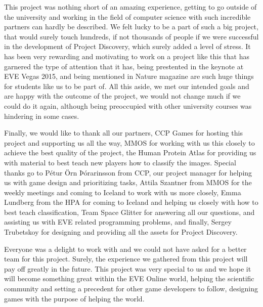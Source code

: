 This project was nothing short of an amazing experience, getting to go outside of the university and working in the field of computer science with such incredible partners can hardly be described. We felt lucky to be a part of such a big project, that would surely touch hundreds, if not thousands of people if we were successful in the development of Project Discovery, which surely added a level of stress. It has been very rewarding and motivating to work on a project like this that has garnered the type of attention that it has, being prestented in the keynote at EVE Vegas 2015, and being mentioned in Nature magazine are such huge things for students like us to be part of. All this aside, we met our intended goals and are happy with the outcome of the project, we would not change much if we could do it again, although being preoccupied with other university courses was hindering in some cases.

Finally, we would like to thank all our partners, CCP Games for hosting this project and supporting us all the way, MMOS for working with us this closely to achieve the best quality of the project, the Human Protein Atlas for providing us with material to best teach new players how to classify the images. Special thanks go to Pétur Örn Þórarinsson from CCP, our project manager for helping us with game design and prioritizing tasks, Attila Szantner from MMOS for the weekly meetings and coming to Iceland to work with us more closely, Emma Lundberg from the HPA for coming to Iceland and helping us closely with how to best teach classification, Team Space Glitter for answering all our questions, and assisting us with EVE related programming problems, and finally, Sergey Trubetskoy for designing and providing all the assets for Project Discovery.

Everyone was a delight to work with and we could not have asked for a better team for this project. Surely, the experience we gathered from this project will pay off greatly in the future. This project was very special to us and we hope it will become something great within the EVE Online world, helping the scientific community and setting a precedent for other game developers to follow, designing games with the purpose of helping the world.